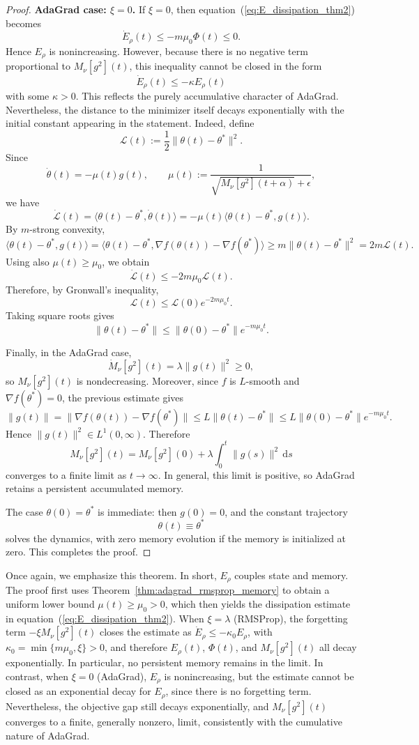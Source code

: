 \documentclass{article} %
\begin{document}
\begin{proof}
\noindent\textbf{AdaGrad case: \(\xi=0\).}
If \(\xi=0\), then equation~(\ref{eq:E_dissipation_thm2}) becomes
\[
\dot E_\rho(t)
\le
-
m\mu_0\Phi(t)
\le 0.
\]
Hence \(E_\rho\) is nonincreasing. However, because there is no negative term proportional to \(M_\nu[g^2](t)\), this inequality cannot be closed in the form
\[
\dot E_\rho(t)\le -\kappa E_\rho(t)
\]
with some \(\kappa>0\). This reflects the purely accumulative character of AdaGrad. Nevertheless, the distance to the minimizer itself decays exponentially with the initial constant appearing in the statement. Indeed, define
\[
\mathcal L(t)
:=
\frac12\|\theta(t)-\theta^*\|^2.
\]
Since
\[
\dot\theta(t)=-\mu(t)g(t),
\qquad
\mu(t):=
\frac{1}{\sqrt{M_\nu[g^2](t+\alpha)}+\epsilon},
\]
we have
\[
\dot{\mathcal L}(t)
=
\langle \theta(t)-\theta^*,\dot\theta(t)\rangle
=
-\mu(t)\langle \theta(t)-\theta^*,g(t)\rangle.
\]
By \(m\)-strong convexity,
\[
\langle \theta(t)-\theta^*,g(t)\rangle
=
\langle \theta(t)-\theta^*,
\nabla f(\theta(t))-\nabla f(\theta^*)\rangle
\ge
m\|\theta(t)-\theta^*\|^2
=
2m\mathcal L(t).
\]
Using also \(\mu(t)\ge\mu_0\), we obtain
\[
\dot{\mathcal L}(t)
\le
-2m\mu_0\mathcal L(t).
\]
Therefore, by Gronwall's inequality,
\[
\mathcal L(t)
\le
\mathcal L(0)e^{-2m\mu_0t}.
\]
Taking square roots gives
\[
\|\theta(t)-\theta^*\|
\le
\|\theta(0)-\theta^*\|e^{-m\mu_0t}.
\]

Finally, in the AdaGrad case,
\[
\dot M_\nu[g^2](t)
=
\lambda\|g(t)\|^2
\ge 0,
\]
so \(M_\nu[g^2](t)\) is nondecreasing. Moreover, since \(f\) is \(L\)-smooth and \(\nabla f(\theta^*)=0\), the previous estimate gives
\[
\|g(t)\|
=
\|\nabla f(\theta(t))-\nabla f(\theta^*)\|
\le
L\|\theta(t)-\theta^*\|
\le
L\|\theta(0)-\theta^*\|e^{-m\mu_0t}.
\]
Hence \(\|g(t)\|^2\in L^1(0,\infty)\). Therefore
\[
M_\nu[g^2](t)
=
M_\nu[g^2](0)
+
\lambda\int_0^t\|g(s)\|^2\,\mathrm ds
\]
converges to a finite limit as \(t\to\infty\). In general, this limit is positive, so AdaGrad retains a persistent accumulated memory.

The case \(\theta(0)=\theta^*\) is immediate: then \(g(0)=0\), and the constant trajectory
\[
\theta(t)\equiv \theta^*
\]
solves the dynamics, with zero memory evolution if the memory is initialized at zero. This completes the proof.
\end{proof}

Once again, we emphasize this theorem. In short, \(E_\rho\) couples state and memory. The proof first uses Theorem~\ref{thm:adagrad_rmsprop_memory} to obtain a uniform lower bound \(\mu(t)\ge \mu_0>0\), which then yields the dissipation estimate in equation~(\ref{eq:E_dissipation_thm2}). When \(\xi=\lambda\) (RMSProp), the forgetting term \(-\xi M_\nu[g^2](t)\) closes the estimate as \(\dot E_\rho\le -\kappa_0 E_\rho\), with \(\kappa_0=\min\{m\mu_0,\xi\}>0\), and therefore \(E_\rho(t)\), \(\Phi(t)\), and \(M_\nu[g^2](t)\) all decay exponentially. In particular, no persistent memory remains in the limit. In contrast, when \(\xi=0\) (AdaGrad), \(E_\rho\) is nonincreasing, but the estimate cannot be closed as an exponential decay for \(E_\rho\), since there is no forgetting term. Nevertheless, the objective gap still decays exponentially, and \(M_\nu[g^2](t)\) converges to a finite, generally nonzero, limit, consistently with the cumulative nature of AdaGrad.
\end{document}
